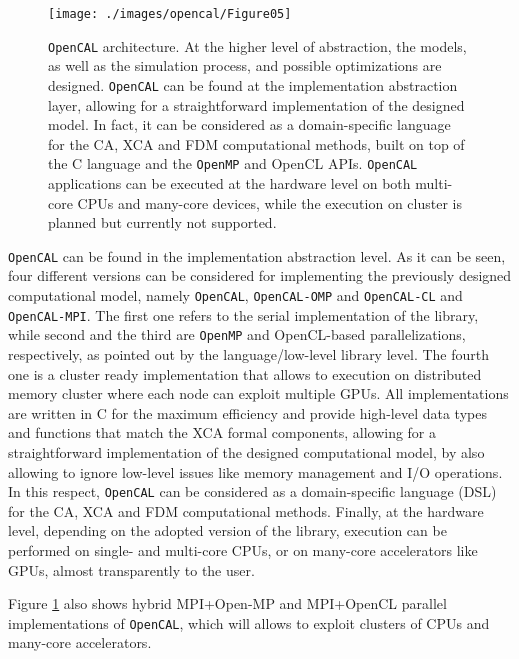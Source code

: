   \begin{figure}
  	\begin{center}
    \texttt{[image: ./images/opencal/Figure05]}
    \caption{\texttt{OpenCAL} architecture. At the higher level of abstraction, the models,
    	as well as the simulation process, and possible optimizations are
    	designed. \texttt{OpenCAL} can be found at the implementation abstraction
    	layer, allowing for a straightforward implementation of the designed
    	model. In fact, it can be considered as a domain-specific language for
    	the CA, XCA and FDM computational methods, built on top of the C
    	language and the \texttt{OpenMP} and OpenCL APIs. \texttt{OpenCAL} applications can be
    	executed at the hardware level on both multi-core CPUs and many-core
    	devices, while the execution on cluster is planned but currently not
    	supported.}
    \label{fig:architecture}
  \end{center}
\end{figure}
  
   \texttt{OpenCAL} can be found in the implementation abstraction level. As it
  can be seen, four different versions can be considered for
  implementing the previously designed computational model, namely
  \texttt{OpenCAL}, \texttt{OpenCAL-OMP} and \texttt{OpenCAL-CL} and \texttt{OpenCAL-MPI}. The first one refers to the   serial implementation of the library, while second and the third are \texttt{OpenMP}  and OpenCL-based parallelizations, respectively, as pointed out by
  the language/low-level library level. The fourth one is a cluster ready implementation that allows to execution on distributed memory cluster where each node can exploit multiple GPUs.
  All implementations are written in C for the maximum efficiency and provide high-level data types and functions that match the XCA formal components, allowing  for a straightforward implementation of the designed computational
  model, by also allowing to ignore low-level issues like memory
  management and I/O operations. In this respect, \texttt{OpenCAL} can be
  considered as a domain-specific language (DSL) for the CA, XCA and
  FDM computational methods. Finally, at the hardware level, depending
  on the adopted version of the library, execution can be performed on
  single- and multi-core CPUs, or on many-core accelerators like GPUs,
  almost transparently to the user.
  
   Figure \ref{fig:architecture} also shows hybrid MPI+Open-MP and
  MPI+OpenCL parallel implementations of \texttt{OpenCAL}, which will allows to
  exploit clusters of CPUs and many-core accelerators. 

